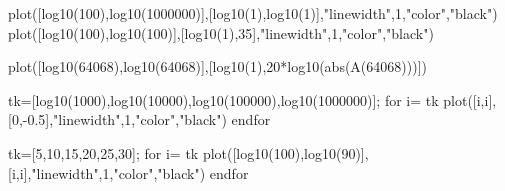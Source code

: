 plot([log10(100),log10(1000000)],[log10(1),log10(1)],"linewidth",1,"color","black")
plot([log10(100),log10(100)],[log10(1),35],"linewidth",1,"color","black")

plot([log10(64068),log10(64068)],[log10(1),20*log10(abs(A(64068)))])

tk=[log10(1000),log10(10000),log10(100000),log10(1000000)];
for i= tk
plot([i,i],[0,-0.5],"linewidth",1,"color","black")
endfor

tk=[5,10,15,20,25,30];
for i= tk
plot([log10(100),log10(90)],[i,i],"linewidth",1,"color","black")
endfor


